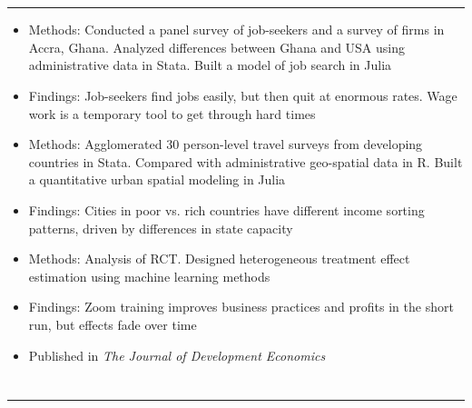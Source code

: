 \documentclass[10pt]{article}
\newenvironment{customitemize}
{ \begin{itemize}[leftmargin=\parindent, topsep = 0.2pt, itemsep = -3pt] }
{\end{itemize} }
\begin{document}
\section*{}
\noindent \rule{\textwidth}{1pt} 
\begin{customitemize}
\item Methods: Conducted a panel survey of job-seekers and a survey of firms in Accra, Ghana. Analyzed differences between Ghana and USA using administrative data in Stata. Built a model of job search in Julia
\item Findings: Job-seekers find jobs easily, but then quit at enormous rates. Wage work is a temporary tool to get through hard times 
\end{customitemize}
\begin{customitemize}
	\item Methods: Agglomerated 30 person-level travel surveys from developing countries in Stata. Compared with administrative geo-spatial data in R. Built a quantitative urban spatial modeling in Julia
	\item Findings: Cities in poor vs. rich countries have different income sorting patterns, driven by differences in state capacity
\end{customitemize}
\begin{customitemize}
	\item Methods: Analysis of RCT. Designed heterogeneous treatment effect estimation using machine learning methods
	\item Findings: Zoom training improves business practices and profits in the short run, but effects fade over time
	\item Published in \textit{The Journal of Development Economics}
\end{customitemize}

\section*{} 
\noindent \rule{\textwidth}{1pt} 
\end{document}
